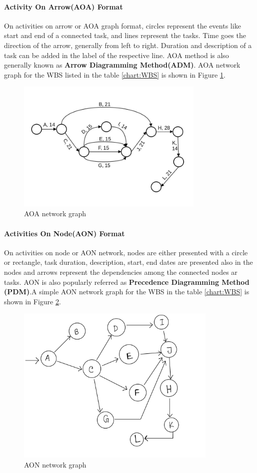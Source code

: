 \begin{spacing}{1}
\paragraph{Activity On Arrow(AOA) Format}
On activities on arrow or AOA graph format, circles represent the events like start and end of a connected task, and lines represent the tasks. Time goes the direction of the arrow, generally from left to right. Duration and description of a task can be added in the label of the respective line. AOA method is also generally known as \textbf{Arrow Diagramming Method(ADM)}. AOA network graph for the  WBS listed in the table \ref{chart:WBS} is shown in Figure \ref{fig:aoa}.

\begin{figure}[H]
	\centering
	\includegraphics[width=0.8\textwidth]{AOA}
	\caption{AOA network graph}
	\label{fig:aoa}
\end{figure} 

\paragraph{Activities On Node(AON) Format}
On activities on node or AON network, nodes are either presented with a circle or rectangle, task duration, description, start, end dates are presented also in the nodes and arrows represent the dependencies among the connected nodes ar tasks. AON is also popularly referred as \textbf{Precedence Diagramming Method (PDM)}.A simple AON network graph for the WBS in the table \ref{chart:WBS} is shown in Figure \ref{fig:aon}.

\begin{figure}[H]
	\centering
	\includegraphics[width=\textwidth, height=3in]{AON}
	\caption{AON network graph}
	\label{fig:aon}
\end{figure} 


\end{spacing}
